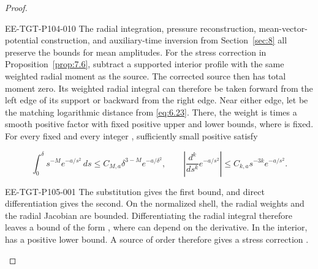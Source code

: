 \begin{proof}
\begin{EESegment}{EE-TGT-P104-010}
The radial integration, pressure reconstruction, mean-vector-potential construction, and
auxiliary-time inversion from Section~\ref{sec:8} all preserve the bounds for mean amplitudes. For
the stress correction in Proposition~\ref{prop:7.6}, subtract a supported interior profile with the
same weighted radial moment as the source. The corrected source then has total moment zero. Its
weighted radial integral can therefore be taken forward from the left edge of its support or
backward from the right edge. Near either edge, let  be the matching
logarithmic distance from \eqref{eq:6.23}. There, the weight  is
 times a smooth positive factor with fixed positive upper and lower
bounds, where  is fixed. For every fixed
 and every integer , sufficiently small
positive  satisfy
\end{EESegment}
\[
\int_0^\delta s^{-M}e^{-a/s^2}\,ds
 \le C_{M,a}\delta^{3-M}e^{-a/\delta^2},
\qquad
\left|\frac{d^k}{ds^k}e^{-a/s^2}\right|
 \le C_{k,a}s^{-3k}e^{-a/s^2}.
\]
%
\begin{EESegment}{EE-TGT-P105-001}
The substitution  gives the first bound, and direct differentiation
gives the second. On the normalized shell, the radial weights and the radial Jacobian are bounded.
Differentiating the radial integral therefore leaves a bound of the form
, where  can depend on the
derivative. In the interior,  has a positive lower bound. A source of
order  therefore gives a stress correction
.
\end{EESegment}


\end{proof}
